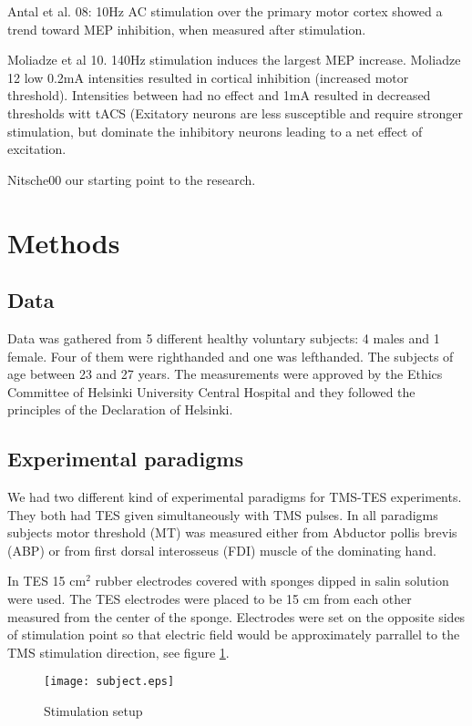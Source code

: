 \documentclass[english,12pt,a4paper,dvips]{article}
\begin{document}
Antal et al. 08: 10Hz AC stimulation over the primary motor cortex showed a trend toward MEP inhibition, when measured after stimulation.

Moliadze et al 10. 140Hz stimulation induces the largest MEP increase. 
Moliadze 12 low 0.2mA intensities resulted in cortical inhibition (increased motor threshold). Intensities between had no effect and 1mA resulted in decreased thresholds witt tACS (Exitatory neurons are less susceptible and require stronger stimulation, but dominate the inhibitory neurons leading to a net effect of excitation.

Nitsche00 our starting point to the research.



\clearpage

\section{Methods}
\subsection{Data}
Data was gathered from 5 different healthy voluntary subjects: 4 males and 1 female. Four of them were righthanded and one was lefthanded. The subjects of age between 23 and 27 years. The measurements were approved by the Ethics Committee of Helsinki University Central Hospital and they followed the principles of the Declaration of Helsinki.


\subsection{Experimental paradigms}

We had two different kind of experimental paradigms for TMS-TES experiments. They both had TES given simultaneously with TMS pulses. In all paradigms subjects motor threshold (MT) was measured either from Abductor pollis brevis (ABP) or from first dorsal interosseus (FDI) muscle of the dominating hand. 

In TES 15 cm$^{2}$ rubber electrodes covered with sponges dipped in salin solution were used. The TES electrodes were placed to be 15 cm from each other measured from the center of the sponge. Electrodes were set on the opposite sides of stimulation point so that electric field would be approximately parrallel to the TMS stimulation direction, see figure \ref{fig:setup}. 

\begin{figure}[here]
\texttt{[image: subject.eps]}
\caption{Stimulation setup}
\label{fig:setup}
\end{figure}
\end{document}
